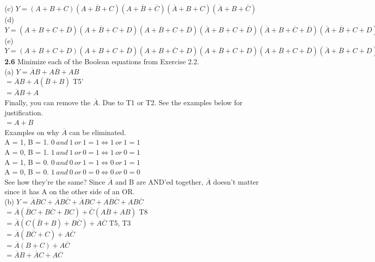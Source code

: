 \documentclass[12pt,a4paper]{report}
\newcommand*{\al}{\overline{A}}
\newcommand*{\bl}{\overline{B}}
\newcommand*{\cl}{\overline{C}}
\begin{document}
\begin{normalsize}
(c) $ Y = (A + B + C) (A + \overline{B} + C) (A + \overline{B} + \overline{C}) (\overline{A} + B + C) (\overline{A} + B + \overline{C}) $ \\

(d) $ Y = (A + B + C + \overline{D}) (A + \overline{B} + C + D) (A + \overline{B} + C + \overline{D}) (\overline{A} + B + C + \overline{D}) (\overline{A} + B + \overline{C} + \overline{D}) (\overline{A} + \overline{B} + C + D) (\overline{A} + \overline{B} + C + \overline{D}) (\overline{A} + \overline{B} + \overline{C} + D) (\overline{A} + \overline{B} + \overline{C} + \overline{D}) $ \\

(e) $ Y = (A + B + C + D) (A + B + C + \overline{D}) (A + B + \overline{C} + D) (A + \overline{B} + C + D) (A + \overline{B} + C + \overline{D}) (\overline{A} + \overline{B} + C + D) (\overline{A} + \overline{B} + C + \overline{D}) (\overline{A} + \overline{B} + \overline{C} + D) (\overline{A} + \overline{B} + \overline{C} + \overline{D}) $ \\

\textbf{2.6} Minimize each of the Boolean equations from Exercise 2.2. \\
(a) $ Y = \overline{A}B + A\overline{B} + AB $ \\
$ = \al{}B + A(\bl{}+B) $ T5'\\
$ = \al{}B + A $ \\
Finally, you can remove the $ \al{} $. Due to T1 or T2. See the examples below for justification.\\
$ = A + B $ \\
Examples on why $ \al{} $ can be eliminated. \\
A = 1, B = 1. $ 0\: and\: 1\: or\: 1 = 1 \Leftrightarrow 1\: or\: 1 = 1 $ \\
A = 0, B = 1. $ 1\: and\: 1\: or\: 0 = 1 \Leftrightarrow 1\: or\: 0 = 1 $ \\
A = 1, B = 0. $ 0\: and\: 0\: or\: 1 = 1 \Leftrightarrow 0\: or\: 1 = 1 $ \\
A = 0, B = 0. $ 1\: and\: 0\: or\: 0 = 0 \Leftrightarrow 0\: or\: 0 = 0 $ \\
See how they're the same? Since $ \al{} $ and B are AND'ed together, $ \al{} $ doesn't matter since it has A on the other side of an OR. \\

(b) $ Y = \overline{A}\overline{B}C + \overline{A}B\overline{C} + \overline{A}BC + A\overline{B}\overline{C} + AB\overline{C}$ \\
$ = \al{}(\bl{}C + B\cl{} + BC) + \cl{}(A\bl{} + AB) $ T8 \\
$ = \al{}(C(\bl{}+B) + B\cl{}) + A\cl{} $ T5, T3 \\
$ = \al{}(B\cl{} + C) + A\cl{} $ \\
$ = \al{}(B + C) + A\cl{} $ \\
$ = \al{}B + \al{}C + A\cl{} $ \\


\end{normalsize}
\end{document}
